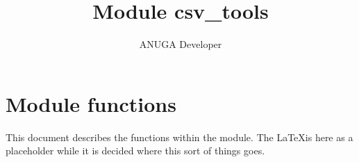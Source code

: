 \documentclass{manual}
\title{Module csv\_tools}
\author{ANUGA Developer}
\begin{document}
\maketitle

\chapter{Module  functions}

This document describes the functions within the  module.
The \LaTeX is here as a placeholder while it is decided where this sort of things goes.

\section{}
\end{document}
